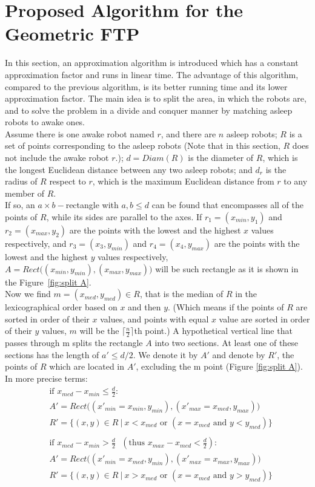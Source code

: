 \documentclass{cccg12}
\begin{document}
\section{Proposed Algorithm for the Geometric FTP}
In this section, an approximation algorithm is introduced which has a constant approximation factor and runs in linear time. The advantage of this algorithm, compared to the previous algorithm, is its better running time and its lower approximation factor. The main idea is to split the area, in which the robots are, and to solve the problem in a divide and conquer manner by matching asleep robots to awake ones.\\
Assume there is one awake robot named $r$, and there are $n$ asleep robots; $R$ is a set of points corresponding to the asleep robots (Note that in this section, $R$ does not include the awake robot $r$.); ${ d=Diam(R) }$ is the diameter of $R$, which is the longest Euclidean distance between any two asleep robots; and $d_r$ is the radius of $R$ respect to $r$, which is the maximum Euclidean distance from $r$ to any member of $R$.\\
If so, an ${a\times b-}$rectangle with ${ a,b \leq d }$ can be found that encompasses all of the points of $R$, while its sides are parallel to the axes. If ${ r_1=(x_{min},y_1) }$ and ${ r_2=(x_{max},y_2) }$ are the points with the lowest and the highest $x$ values respectively, and ${ r_3=(x_3,y_{min}) }$ and ${ r_4=(x_4,y_{max}) }$ are the points with the lowest and the highest $y$ values respectively,
${ A=Rect \big( (x_{min},y_{min}),(x_{max},y_{max}) \big) }$
will be such rectangle as it is shown in the Figure~\ref{fig:split A}. \\
Now we find ${ m=(x_{med},y_{med})\in R }$, that is the median of $R$ in the lexicographical order based on $x$ and then $y$. (Which means if the points of $R$ are sorted in order of their $x$ values, and points with equal $x$ value are sorted in order of their $y$ values, $m$ will be the ${ \lceil\frac{n}{2}\rceil }$th point.) A hypothetical vertical line that passes through m splits the rectangle $A$ into two sections. At least one of these sections has the length of ${ a' \leq d/2 }$. We denote it by $A'$ and denote by $R'$, the points of $R$ which are located in $A'$, excluding the m point (Figure \ref{fig:split A}). In more precise terms:
{\small\begin{align}
&\mbox{if \ } x_{med}-x_{min} \leq \frac{d}{2}: \nonumber\\
&A'=Rect\big( (x'_{min}=x_{min},y_{min} ),(x'_{max}=x_{med},y_{max} )  \big) \nonumber\\
&R'=\big\{(x,y)\in R\ \big|\ x<x_{med} \mbox{ or } (x=x_{med} \mbox{ and } y<y_{med} )  \big\} \nonumber\\
\nonumber\\
&\mbox{if \ } x_{med}-x_{min}>\frac{d}{2}\ \ \ (\mbox{thus \ } x_{max}-x_{med}<\frac{d}{2}): \nonumber\\
&A'=Rect\big( (x'_{min}=x_{med},y_{min} ),( x'_{max}=x_{max},y_{max} )  \big) \nonumber\\
&R'=\big\{(x,y)\in R\ \big|\ x>x_{med} \mbox{ or } (x=x_{med} \mbox{ and } y>y_{med} ) \big\} \nonumber
\end{align}}
\end{document}
